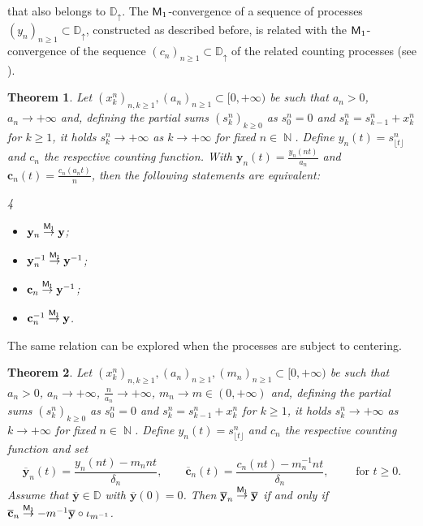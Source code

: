 \documentclass[]{amsart}
\numberwithin{equation}{section}
\newtheorem{thm}{Theorem}[section]
\theoremstyle{remark}
\theoremstyle{definition}
\DeclareMathOperator{\N}{\mathbb{N}}
\begin{document}
that also belongs to $\mathbb{D}_{\uparrow}$. The ${\sf M}_1$-convergence of a sequence of processes $(y_n)_{n \ge 1} \subset \mathbb{D}_{\uparrow}$, constructed as described before, is related with the ${\sf M}_1$-convergence of the sequence $(c_n)_{n \ge 1}\subset \mathbb{D}_{\uparrow}$ of the related counting processes (see \cite[Theorem 13.8.1]{whitt2002stochastic}).
\begin{thm}\label{thm:contcounting}
	Let $(x_k^n)_{n,k \ge 1},(a_n)_{n \ge 1}\subset [0,+\infty)$ be such that $a_n>0$, $a_n \to +\infty$ and, defining the partial sums $(s_k^n)_{k \ge 0}$ as $s_0^n=0$ and $s_k^n=s_{k-1}^n+x_k^n$ for $k \ge 1$,
	it holds $s_k^n \to +\infty$ as $k \to +\infty$ for fixed $n \in \N$. Define $y_n(t)=s_{\lfloor t \rfloor}^n$ and $c_n$ the respective counting function. With $\mathbf{y}_n(t)=\frac{y_n(nt)}{a_n}$ and $\mathbf{c}_n(t)=\frac{c_n(a_nt)}{n}$, then the following statements are equivalent:
	\setlength{\columnsep}{3pt}
	\begin{multicols}{4}
		\begin{itemize}
			\item[$(i)$] $\mathbf{y}_n \overset{\sf M_1}{\to} \mathbf{y}$;
			\item[$(ii)$] $\mathbf{y}_n^{-1} \overset{\sf M_1}{\to} \mathbf{y}^{-1}$;
			\item[$(iii)$] $\mathbf{c}_n \overset{\sf M_1}{\to} \mathbf{y}^{-1}$;
			\item[$(iv)$] $\mathbf{c}_n^{-1}\overset{\sf M_1}{\to}\mathbf{y}$.
		\end{itemize}
	\end{multicols}
	\setlength{\columnsep}{10pt}
\end{thm}
The same relation can be explored when the processes are subject to centering.
\begin{thm}\label{thm:countingcenter}
	Let $(x_k^n)_{n,k \ge 1},(a_n)_{n \ge 1},(m_n)_{n \ge 1}\subset [0,+\infty)$ be such that $a_n>0$, $a_n \to +\infty$, $\frac{n}{a_n}\to +\infty$, $m_n \to m \in (0,+\infty)$ and, defining the partial sums $(s_k^n)_{k \ge 0}$ as $s_0^n=0$ and $s_k^n=s_{k-1}^n+x_k^n$ for $k \ge 1$,
	it holds $s_k^n \to +\infty$ as $k \to +\infty$ for fixed $n \in \N$. Define $y_n(t)=s_{\lfloor t \rfloor}^n$ and $c_n$ the respective counting function and set
	\begin{equation*}
		\overline{\mathbf{y}}_n(t)=\frac{y_n(nt)-m_nnt}{\delta_n}, \qquad \overline{\mathbf{c}}_n(t)=\frac{c_n(nt)-m_n^{-1}nt}{\delta_n}, \qquad \mbox{ for } t \ge 0.
	\end{equation*}
	Assume that $\overline{\mathbf{y}} \in \mathbb{D}$ with $\overline{\mathbf{y}}(0)=0$. Then $\overline{\mathbf{y}}_n \overset{\sf M_1}{\to} \overline{\mathbf{y}}$ if and only if $\overline{\mathbf{c}}_n \overset{\sf M_1}{\to} -m^{-1}\overline{\mathbf{y}} \circ \iota_{m^{-1}}$.
\end{thm}
\end{document}
